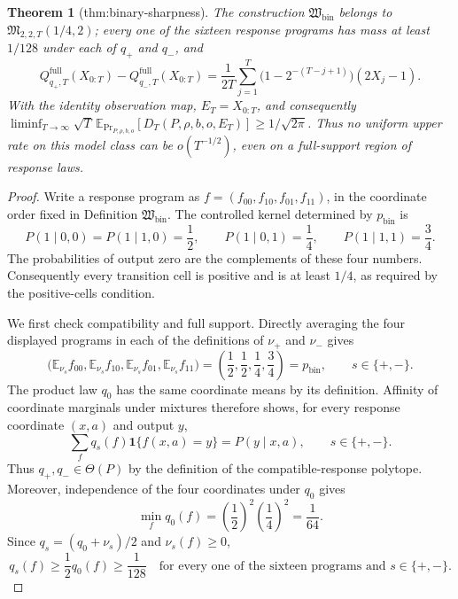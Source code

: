 \documentclass{article}
\newtheorem{theorem}{Theorem}
\begin{document}
\begin{theorem}[thm:binary-sharpness]\label{thm:binary-sharpness}
The construction \(\mathfrak W_{\mathrm{bin}}\) belongs to \(\mathfrak M_{2,2,T}(1/4,2)\); every one of the sixteen response programs has mass at least \(1/128\) under each of \(q_+\) and \(q_-\), and \[Q^{\mathrm{full}}_{q_+,T}(X_{0:T})-Q^{\mathrm{full}}_{q_-,T}(X_{0:T})=\frac{1}{2T}\sum_{j=1}^T\bigl(1-2^{-(T-j+1)}\bigr)(2X_j-1).\] With the identity observation map, \(E_T=X_{0:T}\), and consequently \(\liminf_{T\to\infty}\sqrt T\,\mathbb E_{\Pr_{P,\rho,b,o}}[D_T(P,\rho,b,o,E_T)]\ge1/\sqrt{2\pi}\). Thus no uniform upper rate on this model class can be \(o(T^{-1/2})\), even on a full-support region of response laws.
\end{theorem}
\begin{proof}
Write a response program as \(f=(f_{00},f_{10},f_{01},f_{11})\), in the coordinate order fixed in Definition \(\mathfrak W_{\mathrm{bin}}\).  The controlled kernel determined by \(p_{\mathrm{bin}}\) is
\[
 P(1\mid 0,0)=P(1\mid 1,0)=\frac12,
 \qquad
 P(1\mid 0,1)=\frac14,
 \qquad
 P(1\mid 1,1)=\frac34 .
\]
The probabilities of output zero are the complements of these four numbers.  Consequently every transition cell is positive and is at least \(1/4\), as required by the positive-cells condition.

We first check compatibility and full support.  Directly averaging the four displayed programs in each of the definitions of \(\nu_+\) and \(\nu_-\) gives
\[
 \bigl(\mathbb E_{\nu_s}f_{00},\mathbb E_{\nu_s}f_{10},
        \mathbb E_{\nu_s}f_{01},\mathbb E_{\nu_s}f_{11}\bigr)
 =\left(\frac12,\frac12,\frac14,\frac34\right)=p_{\mathrm{bin}},
 \qquad s\in\{+,-\}.
\]
The product law \(q_0\) has the same coordinate means by its definition.  Affinity of coordinate marginals under mixtures therefore shows, for every response coordinate \((x,a)\) and output \(y\),
\[
 \sum_f q_s(f)\mathbf 1\{f(x,a)=y\}=P(y\mid x,a),
 \qquad s\in\{+,-\}.
\]
Thus \(q_+,q_-\in\Theta(P)\) by the definition of the compatible-response polytope.  Moreover, independence of the four coordinates under \(q_0\) gives
\[
 \min_f q_0(f)
 =\left(\frac12\right)^2\left(\frac14\right)^2
 =\frac1{64}.
\]
Since \(q_s=(q_0+\nu_s)/2\) and \(\nu_s(f)\ge 0\),
\[
 q_s(f)\ge\frac12q_0(f)\ge\frac1{128}
 \quad\text{for every one of the sixteen programs and }s\in\{+,-\}.
\]


\end{proof}
\end{document}
